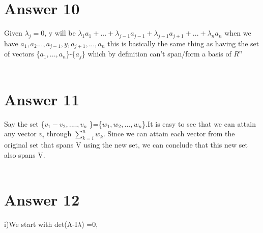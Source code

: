 \documentclass[12pt]{article}
\begin{document}
\section*{Answer 10}
Given $\lambda_{j}=0$, y will be $\lambda_{1}a_{1}+...+\lambda_{j-1}a_{j-1}+\lambda_{j+1}a_{j+1}+...+\lambda_{n}a_{n}$ when we have $a_{1},a_{2}...,a_{j-1},y,a_{j+1},...,a_{n}$ this is basically the same thing as having the set of vectors \{$a_{1},...,a_{n}$\}-\{$a_{j}$\} which by definition can't span/form a basis of $R^{n}$\\\\


\section*{Answer 11}
Say the set \{$v_{1}-v_{2},....,v_{n}$ \}=\{$w_{1},w_{2},...,w_{n}$\}.It is easy to see that we can attain any vector $v_{i}$ through $\sum_{k=i}^{n} w_{k}$. Since we can attain each vector from the original set that spans V using the new set, we can conclude that this new set also spans V.\\\\
	
\section*{Answer 12}
i)We start with det(A-I$\lambda$) =0, \\
\end{document}
